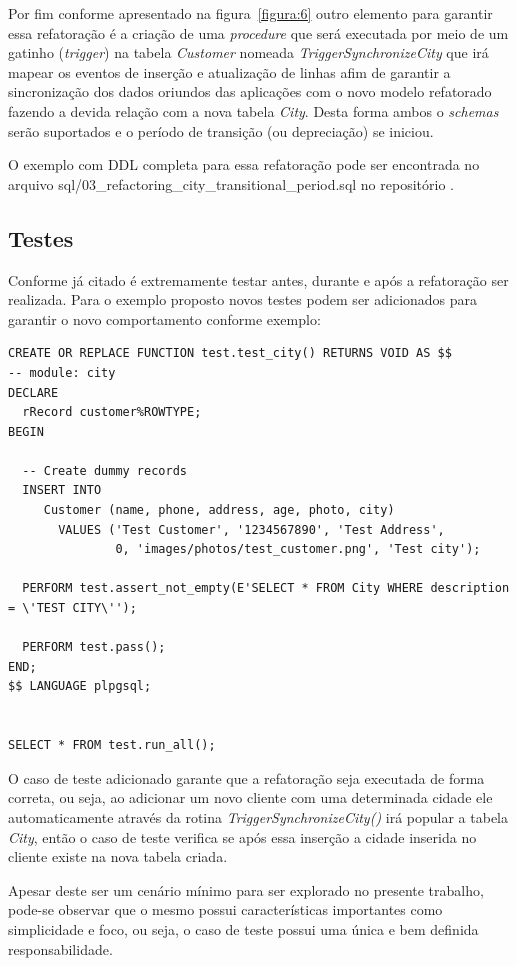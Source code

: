 \documentclass[10pt]{article}
\begin{document}
    Por fim conforme apresentado na figura~\ref{figura:6} outro elemento para garantir essa refatoração é a criação de uma \textit{procedure} que será executada por meio de um gatinho (\textit{trigger}) na tabela \textit{Customer} nomeada \textit{TriggerSynchronizeCity} que irá mapear os eventos de inserção e atualização de linhas afim de garantir a sincronização dos dados oriundos das aplicações com o novo modelo refatorado fazendo a devida relação com a nova tabela \textit{City}. Desta forma ambos o \textit{schemas} serão suportados e o período de transição (ou depreciação) se iniciou.
    
    O exemplo com DDL completa para essa refatoração pode ser encontrada no arquivo sql/03\_refactoring\_city\_transitional\_period.sql no repositório \cite{Mello:DatabaseRefactoringRepository}.

\subsection{Testes}
    Conforme já citado é extremamente testar antes, durante e após a refatoração ser realizada. Para o exemplo proposto novos testes podem ser adicionados para garantir o novo comportamento conforme exemplo:
    \begin{verbatim}
CREATE OR REPLACE FUNCTION test.test_city() RETURNS VOID AS $$
-- module: city
DECLARE
  rRecord customer%ROWTYPE;
BEGIN

  -- Create dummy records
  INSERT INTO
     Customer (name, phone, address, age, photo, city)
       VALUES ('Test Customer', '1234567890', 'Test Address', 
               0, 'images/photos/test_customer.png', 'Test city');

  PERFORM test.assert_not_empty(E'SELECT * FROM City WHERE description = \'TEST CITY\'');

  PERFORM test.pass();
END;
$$ LANGUAGE plpgsql;


SELECT * FROM test.run_all();
    \end{verbatim}

    O caso de teste adicionado garante que a refatoração seja executada de forma correta, ou seja, ao adicionar um novo cliente com uma determinada cidade ele automaticamente através da rotina \textit{TriggerSynchronizeCity()} irá popular a tabela \textit{City}, então o caso de teste verifica se após essa inserção a cidade inserida no cliente existe na nova tabela criada.
    
    Apesar deste ser um cenário mínimo para ser explorado no presente trabalho, pode-se observar que o mesmo possui características importantes como simplicidade e foco, ou seja, o caso de teste possui uma única e bem definida responsabilidade.
\end{document}
